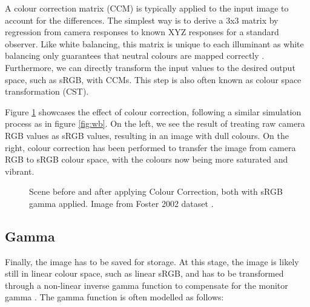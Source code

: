 A colour correction matrix (CCM) is typically applied to the input image to account for the differences. The simplest way is to derive a 3x3 matrix by regression from camera responses to known XYZ responses for a standard observer. Like white balancing, this matrix is unique to each illuminant as white balancing only guarantees that neutral colours are mapped correctly \cite[1]{cheng2015beyond}. Furthermore, we can directly transform the input values to the desired output space, such as sRGB, with CCMs. This step is also often known as colour space transformation (CST).

Figure \ref{fig:cc} showcases the effect of colour correction, following a similar simulation process as in figure \ref{fig:wb}. On the left, we see the result of treating raw camera RGB values as sRGB values, resulting in an image with dull colours. On the right, colour correction has been performed to transfer the image from camera RGB to sRGB colour space, with the colours now being more saturated and vibrant.


\begin{figure}
    \centering
    \caption{Scene before and after applying Colour Correction, both with sRGB gamma applied. Image from Foster 2002 dataset \cite{foster:2002}. }
    \label{fig:cc}
\end{figure}


\subsection{Gamma}


Finally, the image has to be saved for storage. At this stage, the image is likely still in linear colour space, such as linear sRGB, and has to be transformed through a non-linear inverse gamma function to compensate for the monitor gamma \cite{4050037}. The gamma function is often modelled as follows:

